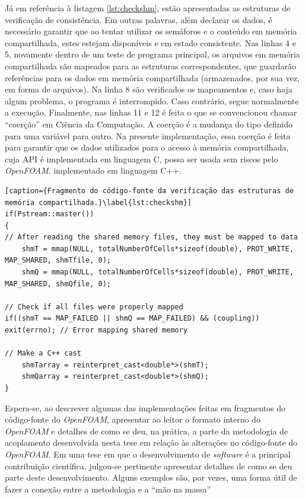 Já em referência à listagem \ref{lst:checkshm}, estão apresentadas as estruturas de verificação
de consistência. Em outras palavras, além declarar os dados, é necessário garantir que ao tentar utilizar
os semáforos e o conteúdo em memória compartilhada, estes estejam disponíveis e em estado consistente.
Nas linhas 4 e 5, novamente dentro de um teste de programa principal, os arquivos em memória compartilhada
são mapeados para as estruturas correspondentes, que guardarão referências para os dados em memória
compartilhada (armazenados, por sua vez, em forma de arquivos). Na linha 8 são verificados os mapeamentos
e, caso haja algum problema, o programa é interrompido. Caso contrário, segue normalmente a execução.
Finalmente, nas linhas 11 e 12 é feita o que se convencionou chamar ``coerção'' em Ciência da Computação.
A coerção é a mudança do tipo definido para uma variável para outro. Na presente implementação, essa coerção
é feita para garantir que os dados utilizados para o acesso à memória compartilhada, cuja API é implementada
em linguagem C, possa ser usada sem riscos pelo \textit{OpenFOAM}, implementado em linguagem C++.

\begin{lstlisting}[caption={Fragmento do código-fonte da verificação das estruturas de memória compartilhada.}\label{lst:checkshm}]
if(Pstream::master())
{
// After reading the shared memory files, they must be mapped to data
    shmT = mmap(NULL, totalNumberOfCells*sizeof(double), PROT_WRITE, MAP_SHARED, shmTfile, 0);
    shmQ = mmap(NULL, totalNumberOfCells*sizeof(double), PROT_WRITE, MAP_SHARED, shmQfile, 0);

// Check if all files were properly mapped
if((shmT == MAP_FAILED || shmQ == MAP_FAILED) && (coupling)) exit(errno); // Error mapping shared memory

// Make a C++ cast
    shmTarray = reinterpret_cast<double*>(shmT);
    shmQarray = reinterpret_cast<double*>(shmQ);
}
\end{lstlisting}




Espera-se, ao descrever algumas das implementações feitas em fragmentos do código-fonte
do \textit{OpenFOAM}, apresentar ao leitor o formato interno do \textit{OpenFOAM}
e detalhes de como se deu, na prática, a parte da metodologia de acoplamento
desenvolvida nesta tese em relação às alterações no código-fonte do \textit{OpenFOAM}.
Em uma tese em que o desenvolvimento de \textit{software} é a principal contribuição científica,
julgou-se pertinente apresentar detalhes de como se deu parte deste desenvolvimento. Alguns exemplos
são, por vezes, uma forma útil de fazer a conexão entre a metodologia e a ``mão na massa''

